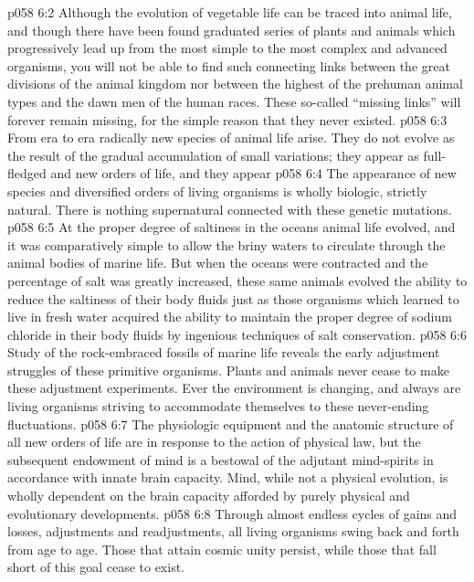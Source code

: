 \vs p058 6:2 \pc Although the evolution of vegetable life can be traced into animal life, and though there have been found graduated series of plants and animals which progressively lead up from the most simple to the most complex and advanced organisms, you will not be able to find such connecting links between the great divisions of the animal kingdom nor between the highest of the prehuman animal types and the dawn men of the human races. These so\hyp{}called “missing links” will forever remain missing, for the simple reason that they never existed.
\vs p058 6:3 From era to era radically new species of animal life arise. They do not evolve as the result of the gradual accumulation of small variations; they appear as full\hyp{}fledged and new orders of life, and they appear 
\vs p058 6:4 The  appearance of new species and diversified orders of living organisms is wholly biologic, strictly natural. There is nothing supernatural connected with these genetic mutations.
\vs p058 6:5 At the proper degree of saltiness in the oceans animal life evolved, and it was comparatively simple to allow the briny waters to circulate through the animal bodies of marine life. But when the oceans were contracted and the percentage of salt was greatly increased, these same animals evolved the ability to reduce the saltiness of their body fluids just as those organisms which learned to live in fresh water acquired the ability to maintain the proper degree of sodium chloride in their body fluids by ingenious techniques of salt conservation.
\vs p058 6:6 Study of the rock\hyp{}embraced fossils of marine life reveals the early adjustment struggles of these primitive organisms. Plants and animals never cease to make these adjustment experiments. Ever the environment is changing, and always are living organisms striving to accommodate themselves to these never\hyp{}ending fluctuations.
\vs p058 6:7 The physiologic equipment and the anatomic structure of all new orders of life are in response to the action of physical law, but the subsequent endowment of mind is a bestowal of the adjutant mind\hyp{}spirits in accordance with innate brain capacity. Mind, while not a physical evolution, is wholly dependent on the brain capacity afforded by purely physical and evolutionary developments.
\vs p058 6:8 Through almost endless cycles of gains and losses, adjustments and readjustments, all living organisms swing back and forth from age to age. Those that attain cosmic unity persist, while those that fall short of this goal cease to exist.
